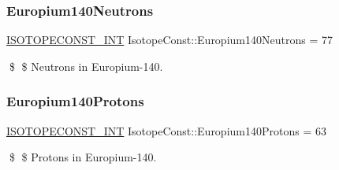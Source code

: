 \subsubsection{\texorpdfstring{Europium140\+Neutrons}{Europium140Neutrons}}
{\footnotesize\ttfamily \mbox{\hyperlink{group___isotope_const-_macros_ga5f18360b3e99483a35c32d789e62621c}{I\+S\+O\+T\+O\+P\+E\+C\+O\+N\+S\+T\+\_\+\+I\+NT}} Isotope\+Const\+::\+Europium140\+Neutrons = 77}

\$ \$ Neutrons in Europium-\/140. \mbox{\label{group___isotope_const-_europium-_eu140_ga4d0719a7cd5d98a78273aec431c2a808}} 
\subsubsection{\texorpdfstring{Europium140\+Protons}{Europium140Protons}}
{\footnotesize\ttfamily \mbox{\hyperlink{group___isotope_const-_macros_ga5f18360b3e99483a35c32d789e62621c}{I\+S\+O\+T\+O\+P\+E\+C\+O\+N\+S\+T\+\_\+\+I\+NT}} Isotope\+Const\+::\+Europium140\+Protons = 63}

\$ \$ Protons in Europium-\/140. 